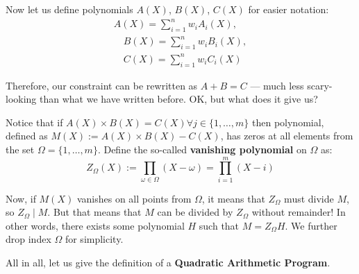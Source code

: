 \documentclass[../lecture-notes.tex]{subfiles}
\begin{document}
Now let us define polynomials $A(X)$, $B(X)$, $C(X)$ for easier notation: 
\begin{equation*}
    \begin{aligned}
        A(X) = \sum_{i = 1}^{n} w_iA_i(X), \\ \quad B(X) = \sum_{i = 1}^{n} w_iB_i(X), \\ \quad C(X) = \sum_{i = 1}^{n} w_iC_i(X)        
    \end{aligned}
\end{equation*}

Therefore, our constraint can be rewritten as $A + B = C$ --- much less scary-looking than what we have written before. OK, but what does it give us? 

Notice that if $A(X) \times B(X)=C(X) \forall j \in \{1,\dots,m\}$ then polynomial, defined as $M(X) := A(X) \times B(X)-C(X)$, has zeros at all elements from the set $\Omega = \{1,\dots,m\}$. Define the so-called \textbf{vanishing polynomial} on $\Omega$ as:
\begin{equation*}
    Z_{\Omega}(X) := \prod_{\omega \in \Omega} (X - \omega) = \prod_{i=1}^m (X - i)
\end{equation*} 

Now, if $M(X)$ vanishes on all points from $\Omega$, it means that $Z_{\Omega}$ must divide $M$, so $Z_{\Omega} \mid M$. But that means
that $M$ can be divided by $Z_{\Omega}$ without remainder! In other words, there exists some polynomial $H$ such that $M=Z_{\Omega}H$. We further drop index $\Omega$ for simplicity. 

All in all, let us give the definition of a \textbf{Quadratic Arithmetic Program}.
\end{document}
